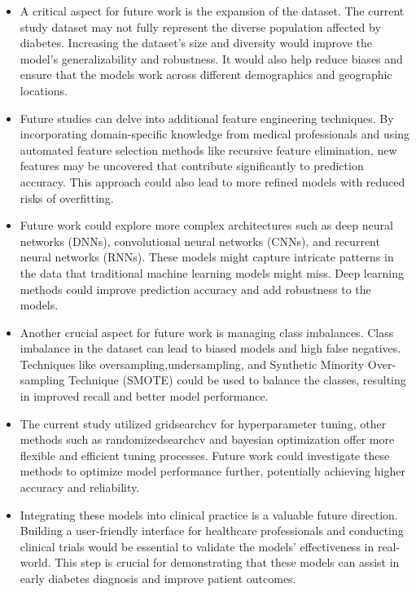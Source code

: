 \begin{itemize}
\item A critical aspect for future work is the expansion of the dataset. The current study dataset may not fully represent the diverse population affected by diabetes. Increasing the dataset's size and diversity would improve the model's generalizability and robustness. It would also help reduce biases and ensure that the models work across different demographics and geographic locations.

\item Future studies can delve into additional feature engineering techniques. By incorporating domain-specific knowledge from medical professionals and using automated feature selection methods like recursive feature elimination, new features may be uncovered that contribute significantly to prediction accuracy. This approach could also lead to more refined models with reduced risks of overfitting.

\item Future work could explore more complex architectures such as deep neural networks (DNNs), convolutional neural networks (CNNs), and recurrent neural networks (RNNs). These models might capture intricate patterns in the data that traditional machine learning models might miss. Deep learning methods could improve prediction accuracy and add robustness to the models.

\item Another crucial aspect for future work is managing class imbalances. Class imbalance in the dataset can lead to biased models and high false negatives. Techniques like oversampling,undersampling, and Synthetic Minority Over-sampling Technique (SMOTE) could be used to balance the classes, resulting in improved recall and better model performance.

\item The current study utilized gridsearchcv for hyperparameter tuning, other methods such as randomizedsearchcv and bayesian optimization offer more flexible and efficient tuning processes. Future work could investigate these methods to optimize model performance further, potentially achieving higher accuracy and reliability.

\item Integrating these models into clinical practice is a valuable future direction. Building a user-friendly interface for healthcare professionals and conducting clinical trials would be essential to validate the models' effectiveness in real-world. This step is crucial for demonstrating that these models can assist in early diabetes diagnosis and improve patient outcomes.
\end{itemize}
